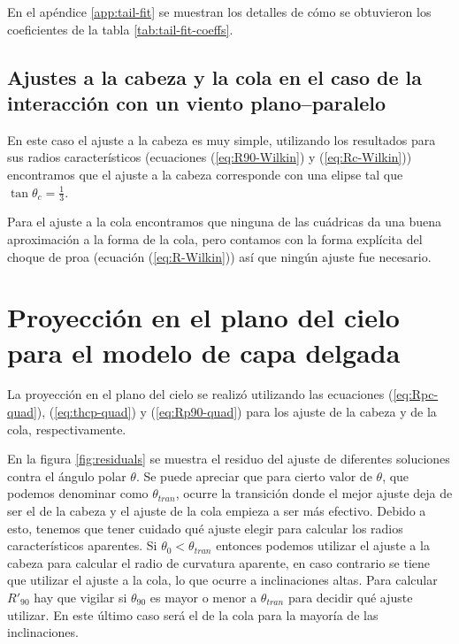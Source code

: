  
 En el apéndice \ref{app:tail-fit} se muestran los detalles de cómo se obtuvieron los coeficientes de la tabla \ref{tab:tail-fit-coeffs}. 
 
 \subsection{Ajustes a la cabeza y la cola en el caso de la interacción con un viento plano--paralelo}

 En este caso el ajuste a la cabeza es muy simple, utilizando los resultados para sus radios característicos
 (ecuaciones (\ref{eq:R90-Wilkin}) y (\ref{eq:Rc-Wilkin})) encontramos que el ajuste a la cabeza corresponde
 con una elipse tal que $\tan\theta_c = \frac{1}{3}$.

 Para el ajuste a la cola encontramos que ninguna de las cuádricas da una buena aproximación a la forma de la
 cola, pero contamos con la forma explícita del choque de proa (ecuación (\ref{eq:R-Wilkin})) así que ningún ajuste fue necesario.
 
 \section{Proyección en el plano del cielo para el modelo de capa delgada}
\label{sec:proyection-CRW}
 La proyección en el plano del cielo se realizó utilizando las ecuaciones (\ref{eq:Rpc-quad}), (\ref{eq:thcp-quad})
 y (\ref{eq:Rp90-quad}) para los ajuste de la cabeza y de la cola, respectivamente.

 En la figura \ref{fig:residuals} se muestra el residuo del ajuste de diferentes soluciones contra el ángulo polar
 $\theta$. Se puede apreciar que para cierto valor de $\theta$, que podemos denominar como $\theta_{tran}$, ocurre
 la transición donde el mejor ajuste deja de ser el de la cabeza y el ajuste de la cola empieza a ser más efectivo.
 Debido a esto, tenemos que tener cuidado qué ajuste elegir para calcular los radios característicos aparentes. Si $\theta_0 < \theta_{tran}$ entonces podemos utilizar el ajuste a la cabeza para calcular el radio de curvatura aparente, en caso contrario se tiene que utilizar el ajuste a la cola, lo que ocurre a inclinaciones altas. Para calcular $R'_{90}$ hay que vigilar si $\theta_{90}$ es mayor o menor a $\theta_{tran}$ para decidir qué ajuste utilizar. En este último caso será el de la cola para la mayoría de las inclinaciones.

